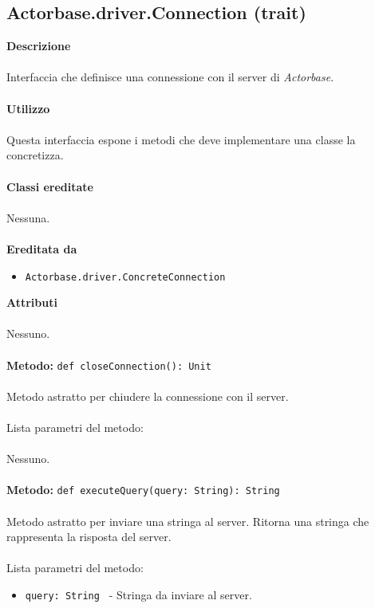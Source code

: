 \documentclass[a4paper]{article}
\begin{document}
	\subsection{Actorbase.driver.Connection (trait)}	
		\textbf{Descrizione}
			\\ \\
			Interfaccia che definisce una connessione con il server di \emph{Actorbase}.
			\\ \\
		\textbf{Utilizzo}
			\\ \\
			Questa interfaccia espone i metodi che deve implementare una classe la concretizza.
			\\ \\
		\textbf{Classi ereditate}
			\\ \\
			Nessuna.
			\\ \\
		\textbf{Ereditata da}
			\begin{itemize}
				\item \texttt{Actorbase.driver.ConcreteConnection}
			\end{itemize}
		\textbf{Attributi}
			\\ \\
			Nessuno.
			\\ \\
			\textbf{Metodo: }\texttt{def closeConnection(): Unit}
			\\ \\
			Metodo astratto per chiudere la connessione con il server.
			\\ \\
			Lista parametri del metodo:
			\\ \\
			Nessuno.
			\\ \\
			\textbf{Metodo: }\texttt{def executeQuery(query: String): String}
			\\ \\
			Metodo astratto per inviare una stringa al server. Ritorna una stringa che rappresenta la risposta del server.
			\\ \\
			Lista parametri del metodo:
			\begin{itemize}
				\item \texttt{query: String } - Stringa da inviare al server.
			\end{itemize}
			
\end{document}
